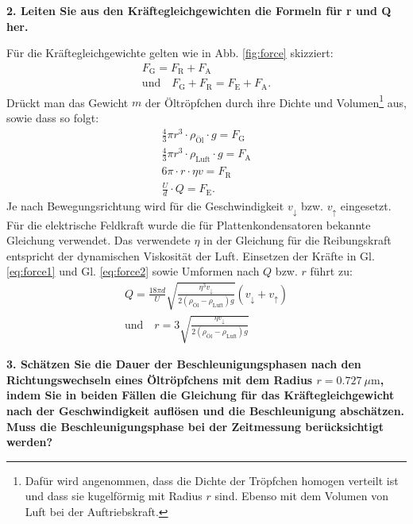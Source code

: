 \vspace{0,5cm}
\noindent \textbf{2. Leiten Sie aus den Kräftegleichgewichten die Formeln für r und Q her.}

	Für die Kräftegleichgewichte gelten wie in Abb. \ref{fig:force} skizziert:
	\begin{align}
		\label{eq:force1}
		F_\text{G} = F_\text{R} + F_\text{A} \\
		\label{eq:force2}
		\text{und} \quad F_\text{G} + F_\text{R} = F_\text{E} + F_\text{A}.
	\end{align}
	Drückt man das Gewicht $m$ der Öltröpfchen durch ihre Dichte und Volumen\footnote{Dafür wird angenommen, dass die Dichte der Tröpfchen homogen verteilt ist und dass sie kugelförmig mit Radius $r$ sind. Ebenso mit dem Volumen von Luft bei der Auftriebskraft.} aus, sowie dass  so folgt:
	\begin{align}
		\frac{4}{3}\pi r^3 \cdot \rho_\text{Öl} \cdot g = F_\text{G}\\
		\frac{4}{3}\pi r^3 \cdot \rho_\text{Luft} \cdot g = F_\text{A}\\
		6\pi \cdot r \cdot \eta v = F_\text{R} \\
		\frac{U}{d} \cdot Q = F_\text{E}. \label{eq:eForce}
	\end{align}
	Je nach Bewegungsrichtung wird für die Geschwindigkeit $v_{\downarrow}$ bzw. $v_{\uparrow}$ eingesetzt. Für die elektrische Feldkraft wurde die für Plattenkondensatoren bekannte Gleichung verwendet. Das verwendete $\eta$ in der Gleichung für die Reibungskraft entspricht der dynamischen Viskosität der Luft.
	Einsetzen der Kräfte in Gl. \ref{eq:force1} und Gl. \ref{eq:force2} sowie Umformen nach $Q$ bzw. $r$ führt zu:
	\begin{align}
		\label{eq:Ladung}
		Q = \frac{18\pi d}{U} \sqrt{\frac{\eta^3 v_\downarrow}{2(\rho_\text{Öl}-\rho_\text{Luft})g}}(v_\downarrow + v_\uparrow) \\
		\text{und} \quad r = 3 \sqrt{\frac{\eta v_\downarrow}{2(\rho_\text{Öl}-\rho_\text{Luft})g}}
	\end{align}
	
\vspace{0,5cm}
\noindent \textbf{3. Schätzen Sie die Dauer der Beschleunigungsphasen nach den Richtungswechseln eines Öltröpfchens mit dem Radius $r = \SI{0,727}{\mu\m}$, indem Sie in beiden Fällen die Gleichung für das Kräftegleichgewicht nach der Geschwindigkeit auflösen und die Beschleunigung abschätzen. Muss die Beschleunigungsphase bei der Zeitmessung berücksichtigt werden?}

